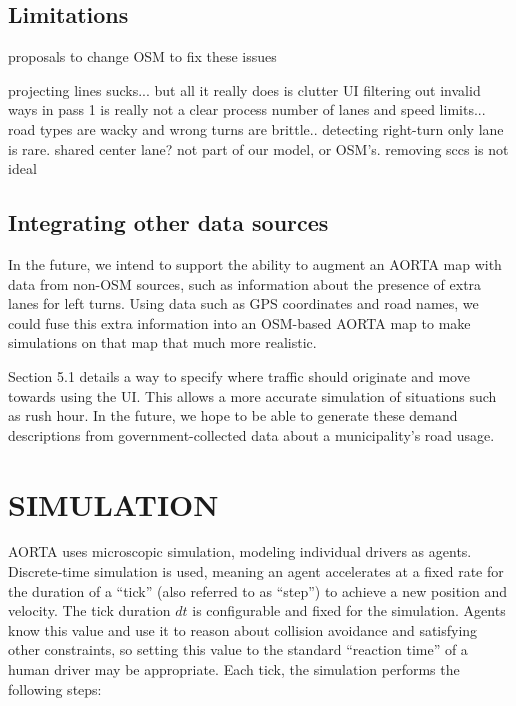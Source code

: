 \documentclass[letterpaper, 10 pt, conference]{ieeeconf}  %
\begin{document}
{

\subsection{Limitations}


proposals to change OSM to fix these issues

projecting lines sucks... but all it really does is clutter UI
filtering out invalid ways in pass 1 is really not a clear process
number of lanes and speed limits... road types are wacky and wrong
turns are brittle.. detecting right-turn only lane is rare. shared center lane?
  not part of our model, or OSM's.
removing sccs is not ideal

\subsection{Integrating other data sources}

In the future, we intend to support the ability to augment an AORTA map with
data from non-OSM sources, such as information about the presence of extra lanes
for left turns. Using data such as GPS coordinates and road names, we could fuse
this extra information into an OSM-based AORTA map to make simulations on that map
that much more realistic.

Section 5.1 details a way to specify where traffic should originate and move
towards using the UI. This allows a more accurate simulation of situations such
as rush hour. In the future, we hope to be able to generate these demand
descriptions from government-collected data about a municipality's road usage.


\section{SIMULATION}

AORTA uses microscopic simulation, modeling individual drivers as agents.
Discrete-time simulation is used, meaning an agent accelerates at a fixed rate
for the duration of a ``tick'' (also referred to as ``step'') to achieve a new
position and velocity. The tick duration $dt$ is configurable and fixed for the
simulation. Agents know this value and use it to reason about collision
avoidance and satisfying other constraints, so setting this value to the
standard ``reaction time'' of a human driver may be appropriate. Each tick, the
simulation performs the following steps:

}
\end{document}
